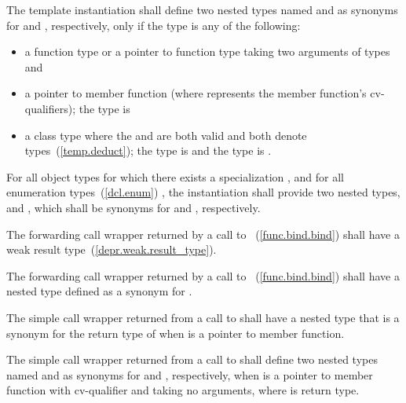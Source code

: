 \pnum
The template instantiation 
shall define two nested types
named  and 
as synonyms for  and , respectively,
only if the type  is any of the following:
\begin{itemize}
\item a function type or a pointer to function type taking two arguments of types  and 
\item a pointer to member function  \cv{} (where \cv{} represents the member function's cv-qualifiers); the type  is \cv{} 
\item a class type where the 
 and 
are both valid and both denote types~(\ref{temp.deduct});
the type  is  and
the type  is .
\end{itemize}

\pnum
For all object types  for which there exists a specialization ,
and for all enumeration types~(\ref{dcl.enum}) ,
the instantiation  shall provide two nested types,
 and ,
which shall be synonyms for  and , respectively.

\pnum
The forwarding call wrapper 
returned by a call to ~(\ref{func.bind.bind})
shall have a weak result type~(\ref{depr.weak.result_type}).

\pnum
The forwarding call wrapper 
returned by a call to ~(\ref{func.bind.bind})
shall have a nested type  defined as a synonym for .

\pnum
The simple call wrapper
returned from a call to 
shall have a nested type 
that is a synonym for
the return type of 
when  is a pointer to member function.

\pnum
The simple call wrapper
returned from a call to 
shall define two nested types
named  and 
as synonyms for \cv{}  and , respectively,
when  is a pointer to member function
with cv-qualifier \cv{}
and taking no arguments,
where  is  return type.

